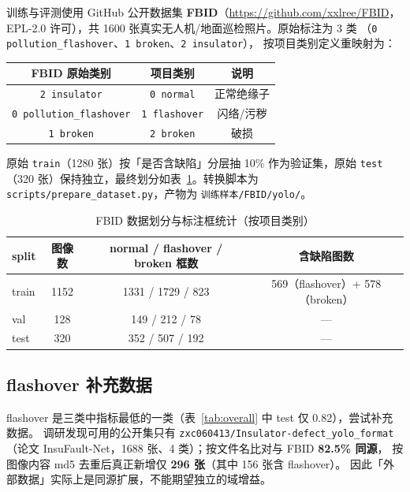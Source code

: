 \documentclass[UTF8,a4paper,11pt]{ctexart}
\begin{document}
训练与评测使用 GitHub 公开数据集 \textbf{FBID}（\url{https://github.com/xxlree/FBID}，
EPL-2.0 许可），共 1600 张真实无人机/地面巡检照片。原始标注为 3 类
（\texttt{0 pollution\_flashover}、\texttt{1 broken}、\texttt{2 insulator}），
按项目类别定义重映射为：

\begin{center}
\begin{tabular}{ccc}
\toprule
FBID 原始类别 & 项目类别 & 说明 \\
\midrule
\texttt{2 insulator} & \texttt{0 normal} & 正常绝缘子 \\
\texttt{0 pollution\_flashover} & \texttt{1 flashover} & 闪络/污秽 \\
\texttt{1 broken} & \texttt{2 broken} & 破损 \\
\bottomrule
\end{tabular}
\end{center}

原始 \texttt{train}（1280 张）按「是否含缺陷」分层抽 10\% 作为验证集，原始 \texttt{test}
（320 张）保持独立，最终划分如表~\ref{tab:data}。转换脚本为
\texttt{scripts/prepare\_dataset.py}，产物为 \texttt{训练样本/FBID/yolo/}。

\begin{table}[htbp]
\centering
\caption{FBID 数据划分与标注框统计（按项目类别）}
\label{tab:data}
\begin{tabular}{lccc}
\toprule
split & 图像数 & normal / flashover / broken 框数 & 含缺陷图数 \\
\midrule
train & 1152 & 1331 / 1729 / 823 & 569（flashover）+ 578（broken） \\
val   & 128  & 149 / 212 / 78   & --- \\
test  & 320  & 352 / 507 / 192  & --- \\
\bottomrule
\end{tabular}
\end{table}

\subsection{flashover 补充数据}

flashover 是三类中指标最低的一类（表~\ref{tab:overall} 中 test 仅 0.82），尝试补充数据。
调研发现可用的公开集只有 \texttt{zxc060413/Insulator-defect\_yolo\_format}
（论文 InsuFault-Net，1688 张、4 类）；按文件名比对与 FBID \textbf{82.5\% 同源}，
按图像内容 md5 去重后真正新增仅 \textbf{296 张}（其中 156 张含 flashover）。
因此「外部数据」实际上是同源扩展，不能期望独立的域增益。
\end{document}
